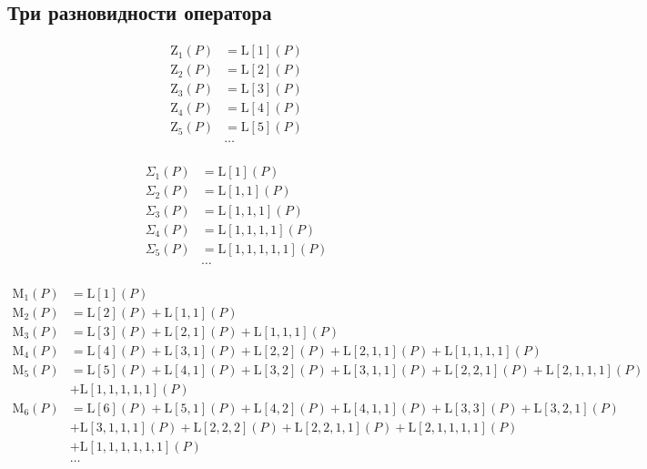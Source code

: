 
\subsection{Три разновидности оператора}

\begin{equation*} \begin{aligned}
\mathrm{Z}_1(P) &= \mathrm{L}[1](P) \\
\mathrm{Z}_2(P) &= \mathrm{L}[2](P) \\
\mathrm{Z}_3(P) &= \mathrm{L}[3](P) \\
\mathrm{Z}_4(P) &= \mathrm{L}[4](P) \\
\mathrm{Z}_5(P) &= \mathrm{L}[5](P) \\
&\ldots \\
\end{aligned} \end{equation*}

\begin{equation*} \begin{aligned}
\Sigma_1(P) &= \mathrm{L}[1](P) \\
\Sigma_2(P) &= \mathrm{L}[1,1](P) \\
\Sigma_3(P) &= \mathrm{L}[1,1,1](P) \\
\Sigma_4(P) &= \mathrm{L}[1,1,1,1](P) \\
\Sigma_5(P) &= \mathrm{L}[1,1,1,1,1](P) \\
&\ldots \\
\end{aligned} \end{equation*}

\begin{equation*} \begin{aligned}
\mathrm{M}_1(P) &=
  \mathrm{L}[1](P) \\
%
\mathrm{M}_2(P) &=
  \mathrm{L}[2](P)
+ \mathrm{L}[1,1](P) \\
%
\mathrm{M}_3(P) &=
  \mathrm{L}[3](P)
+ \mathrm{L}[2,1](P)
+ \mathrm{L}[1,1,1](P) \\
%
\mathrm{M}_4(P) &=
  \mathrm{L}[4](P)
+ \mathrm{L}[3,1](P)
+ \mathrm{L}[2,2](P)
+ \mathrm{L}[2,1,1](P)
+ \mathrm{L}[1,1,1,1](P) \\
%
\mathrm{M}_5(P) &=
  \mathrm{L}[5](P)
+ \mathrm{L}[4,1](P)
+ \mathrm{L}[3,2](P)
+ \mathrm{L}[3,1,1](P)
+ \mathrm{L}[2,2,1](P)
+ \mathrm{L}[2,1,1,1](P) \\ &
+ \mathrm{L}[1,1,1,1,1](P) \\
%
\mathrm{M}_6(P) &=
  \mathrm{L}[6](P)
+ \mathrm{L}[5,1](P)
+ \mathrm{L}[4,2](P)
+ \mathrm{L}[4,1,1](P)
+ \mathrm{L}[3,3](P)
+ \mathrm{L}[3,2,1](P) \\ &
+ \mathrm{L}[3,1,1,1](P)
+ \mathrm{L}[2,2,2](P)
+ \mathrm{L}[2,2,1,1](P)
+ \mathrm{L}[2,1,1,1,1](P) \\ &
+ \mathrm{L}[1,1,1,1,1,1](P) \\
%
&\ldots \\
\end{aligned} \end{equation*}

